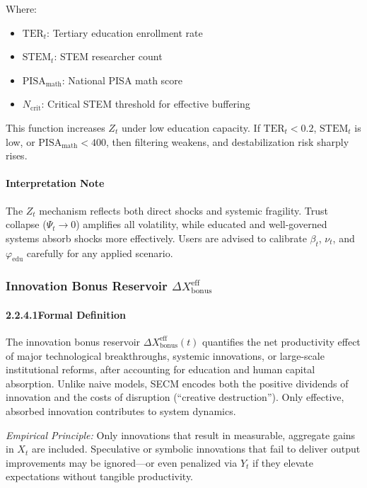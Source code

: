 \documentclass[12pt]{report}
\begin{document}
Where:
\begin{itemize}
  \item $\text{TER}_t$: Tertiary education enrollment rate
  \item $\text{STEM}_t$: STEM researcher count
  \item $\text{PISA}_{\text{math}}$: National PISA math score
  \item $N_{\text{crit}}$: Critical STEM threshold for effective buffering
\end{itemize}

This function increases $Z_t$ under low education capacity. If $\text{TER}_t < 0.2$, $\text{STEM}_t$ is low, or $\text{PISA}_{\text{math}} < 400$, then filtering weakens, and destabilization risk sharply rises.

\paragraph{Interpretation Note}
The $Z_t$ mechanism reflects both direct shocks and systemic fragility. Trust collapse ($\Psi_t \to 0$) amplifies all volatility, while educated and well-governed systems absorb shocks more effectively. Users are advised to calibrate $\beta_t$, $\nu_t$, and $\varphi_{\text{edu}}$ carefully for any applied scenario.

\subsubsection{Innovation Bonus Reservoir $\Delta X_{\text{bonus}}^{\text{eff}}$}

\paragraph{2.2.4.1\quad Formal Definition}

The innovation bonus reservoir $\Delta X_{\text{bonus}}^{\text{eff}}(t)$ quantifies the net productivity effect of major technological breakthroughs, systemic innovations, or large-scale institutional reforms, after accounting for education and human capital absorption. Unlike naive models, SECM encodes both the positive dividends of innovation and the costs of disruption (“creative destruction”). Only effective, absorbed innovation contributes to system dynamics.

\textit{Empirical Principle:} Only innovations that result in measurable, aggregate gains in $X_t$ are included. Speculative or symbolic innovations that fail to deliver output improvements may be ignored—or even penalized via $Y_t$ if they elevate expectations without tangible productivity.
\end{document}
